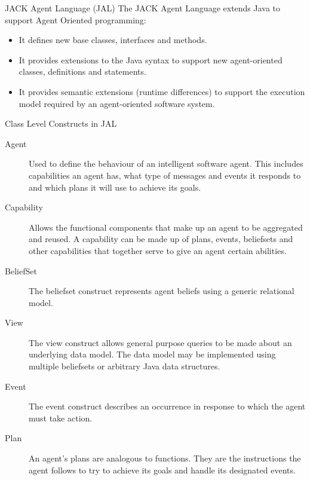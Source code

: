 \documentclass[aspectratio=1610,xcolor=dvipsnames,t]{beamer}
\begin{document}
\begin{frame}{JACK Agent Language (JAL)} 
    The JACK Agent Language extends Java to support Agent Oriented programming:
    \begin{itemize}
        \item It defines new base classes, interfaces and methods. 
        \item It provides extensions to the Java syntax to support new 
              agent-oriented classes, definitions and statements. 
        \item It provides semantic extensions (runtime differences) 
              to support the execution model required by 
              an agent-oriented software system.
    \end{itemize} 
\end{frame} 

\begin{frame}{Class Level Constructs in JAL} 
    \begin{description}
        \item[Agent] Used to define the behaviour of an intelligent 
            software agent. This includes capabilities an agent has, 
            what type of messages and events it responds to and which plans it 
            will use to achieve its goals. 
        \item[Capability] Allows the functional components that make up an 
            agent to be aggregated and reused. A capability can be made up of 
            plans, events, beliefsets and other capabilities that together 
            serve to give an agent certain abilities. 
        \item[BeliefSet] The beliefset construct represents agent beliefs 
            using a generic relational model. 
        \item[View] The view construct allows general purpose queries to 
            be made about an underlying data model. 
            The data model may be implemented using multiple beliefsets 
            or arbitrary Java data structures. 
        \item[Event]The event construct describes an occurrence in 
            response to which the agent must take action. 
        \item[Plan] An agent's plans are analogous to functions. 
            They are the instructions the agent follows to try to 
            achieve its goals and handle its designated events. 
    \end{description} 
\end{frame} 
\end{document}
